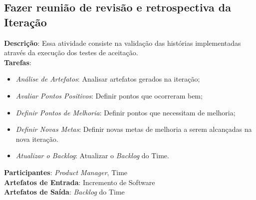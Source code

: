 \subsection{Fazer reunião de revisão e retrospectiva da Iteração}
  \textbf{Descrição}: Essa atividade consiste na validação das histórias implementadas através da execução dos testes de aceitação. \\

  \textbf{Tarefas}:
  \begin{itemize}
   \item \indent \textit{Análise de Artefatos}: Analisar artefatos gerados na iteração;

   \item \indent \textit{Avaliar Pontos Positivos}: Definir pontos que ocorreram bem;

   \item \indent \textit{Definir Pontos de Melhoria}: Definir pontos que necessitam de melhoria;

   \item \indent \textit{Definir Novas Metas}: Definir novas metas de melhoria a serem alcançadas na nova iteração.
   
   \item \indent \textit{Atualizar o \textit{Backlog}}: Atualizar o \textit{Backlog} do Time.
  \end{itemize}

  \textbf{Participantes}: \textit{Product Manager}, Time\\

  \textbf{Artefatos de Entrada}: Incremento de Software \\

  \textbf{Artefatos de Saída}:   \textit{Backlog} do Time \\
